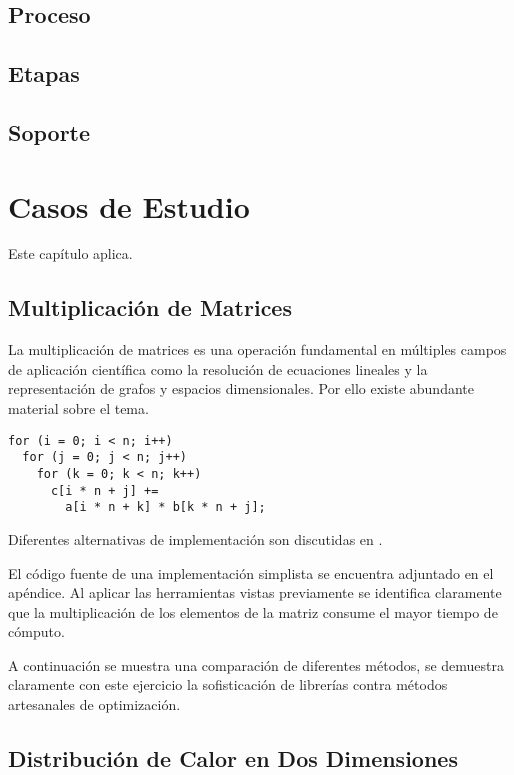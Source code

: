 \documentclass[a4paper]{report}
\begin{document}
\section{Proceso}

\section{Etapas}

\section{Soporte}

\chapter{Casos de Estudio}

Este cap\'itulo aplica.

\section{Multiplicaci\'on de Matrices}

La multiplicaci\'on de matrices es una operaci\'on fundamental en m\'ultiples
campos de aplicaci\'on cient\'ifica como la resoluci\'on de ecuaciones
lineales y la representaci\'on de grafos y espacios dimensionales. Por ello
existe abundante material sobre el tema.

\begin{verbatim}
for (i = 0; i < n; i++)
  for (j = 0; j < n; j++)
    for (k = 0; k < n; k++)
      c[i * n + j] += 
        a[i * n + k] * b[k * n + j];
\end{verbatim}

Diferentes alternativas de implementaci\'on son discutidas en
\cite{mm-matrixmultiplicationtool}.

\bigskip

El c\'odigo fuente de una implementaci\'on simplista se encuentra adjuntado en
el ap\'endice. Al aplicar las herramientas vistas previamente se identifica
claramente que la multiplicaci\'on de los elementos de la matriz consume el
mayor tiempo de c\'omputo.

\bigskip

A continuaci\'on se muestra una comparaci\'on de diferentes m\'etodos, se
demuestra claramente con este ejercicio la sofisticaci\'on de librer\'ias
contra m\'etodos artesanales de optimizaci\'on.

\section{Distribuci\'on de Calor en Dos Dimensiones}
\end{document}
